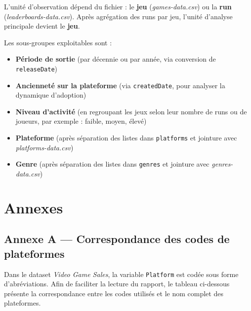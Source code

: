 \documentclass[
]{article}
\providecommand{\tightlist}{%
  \setlength{\itemsep}{0pt}\setlength{\parskip}{0pt}}
\begin{document}
L'unité d'observation dépend du fichier : le \textbf{jeu}
(\emph{games-data.csv}) ou la \textbf{run}
(\emph{leaderboards-data.csv}). Après agrégation des runs par jeu,
l'unité d'analyse principale devient le \textbf{jeu}.

Les sous-groupes exploitables sont :

\begin{itemize}
\tightlist
\item
  \textbf{Période de sortie} (par décennie ou par année, via conversion
  de \texttt{releaseDate})
\item
  \textbf{Ancienneté sur la plateforme} (via \texttt{createdDate}, pour
  analyser la dynamique d'adoption)
\item
  \textbf{Niveau d'activité} (en regroupant les jeux selon leur nombre
  de runs ou de joueurs, par exemple : faible, moyen, élevé)
\item
  \textbf{Plateforme} (après séparation des listes dans
  \texttt{platforms} et jointure avec \emph{platforms-data.csv})
\item
  \textbf{Genre} (après séparation des listes dans \texttt{genres} et
  jointure avec \emph{genres-data.csv})
\end{itemize}

\newpage

\section{Annexes}\label{annexes}

\subsection{Annexe A --- Correspondance des codes de
plateformes}\label{annexe-a-correspondance-des-codes-de-plateformes}

Dans le dataset \emph{Video Game Sales}, la variable \texttt{Platform}
est codée sous forme d'abréviations. Afin de faciliter la lecture du
rapport, le tableau ci-dessous présente la correspondance entre les
codes utilisés et le nom complet des plateformes.
\end{document}
